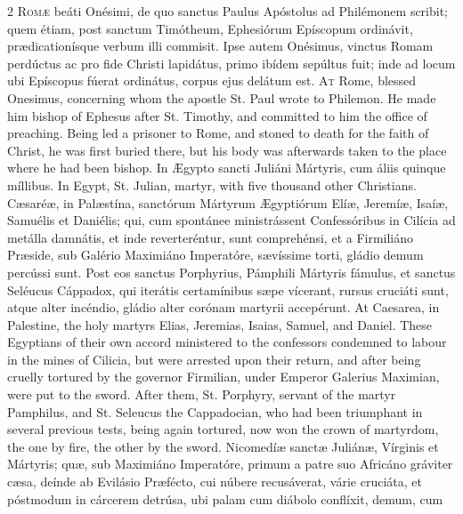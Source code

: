 \begin{paracol}{2}
\lettrine[lines=2]{R}{omæ} beáti Onésimi, de quo sanctus Paulus 
 Apóstolus ad Philémonem scribit; quem étiam, post sanctum Timótheum, 
 Ephesiórum Epíscopum ordinávit, prædicationísque verbum illi commisit. 
 Ipse autem Onésimus, vinctus Romam perdúctus ac pro fide Christi lapidátus, 
 primo ibídem sepúltus fuit; inde ad locum ubi Epíscopus fúerat ordinátus, 
 corpus ejus delátum est.
\switchcolumn
{}
\lettrine[lines=2]{A}{t} Rome, blessed Onesimus, concerning whom the apostle St. Paul wrote to 
 Philemon. He made him bishop of Ephesus after St. Timothy, and 
 committed to him the office of preaching. Being led a prisoner to 
 Rome, and stoned to death for the faith of Christ, he was first buried 
 there, but his body was afterwards taken to the place where he had been 
 bishop.
\switchcolumn*
{}
In Ægypto sancti Juliáni Mártyris, cum áliis 
 quinque míllibus.
\switchcolumn
{}
In Egypt, St. Julian, martyr, with five thousand other Christians.
\switchcolumn*
{}
Cæsaréæ, in Palæstína, sanctórum Mártyrum 
 Ægyptiórum Elíæ, Jeremíæ, Isaíæ, Samuélis et Daniélis; qui, cum spontánee 
 ministrássent Confessóribus in Cilícia ad metálla damnátis, et inde 
 reverteréntur, sunt comprehénsi, et a Firmiliáno Præside, sub Galério 
 Maximiáno Imperatóre, sævíssime torti, gládio demum percússi sunt. 
 Post eos sanctus Porphyrius, Pámphili Mártyris fámulus, et sanctus Seléucus 
 Cáppadox, qui iterátis certamínibus sæpe vícerant, rursus cruciáti sunt, 
 atque alter incéndio, gládio alter corónam martyrii accepérunt.
\switchcolumn
{}
At Caesarea, in Palestine, the holy martyrs Elias, Jeremias, Isaias, Samuel, 
 and Daniel. These Egyptians of their own accord ministered to the 
 confessors condemned to labour in the mines of Cilicia, but were arrested 
 upon their return, and after being cruelly tortured by the governor 
 Firmilian, under Emperor Galerius Maximian, were put to the sword. 
 After them, St. Porphyry, servant of the martyr Pamphilus, and St. Seleucus 
 the Cappadocian, who had been triumphant in several previous tests, being 
 again tortured, now won the crown of martyrdom, the one by fire, the other 
 by the sword.
\switchcolumn*
{}
Nicomedíæ sanctæ Juliánæ, Vírginis et Mártyris; 
 quæ, sub Maximiáno Imperatóre, primum a patre suo Africáno gráviter cæsa, 
 deínde ab Evilásio Præfécto, cui núbere recusáverat, várie cruciáta, et 
 póstmodum in cárcerem detrúsa, ubi palam cum diábolo conflíxit, demum, cum 

\end{paracol}
